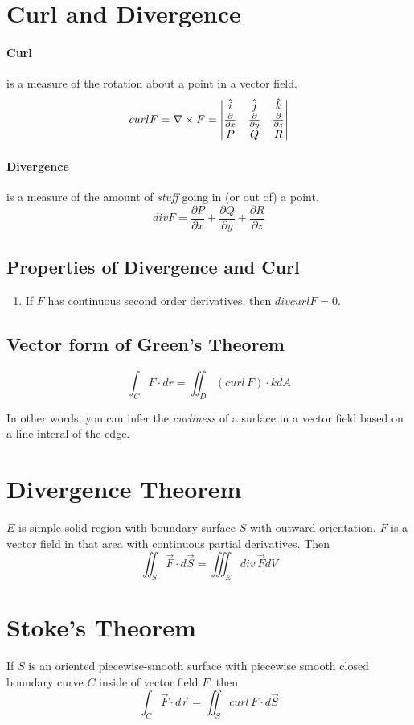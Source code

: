 \documentclass[a4paper,12pt]{report}
\begin{document}
\section{Curl and Divergence}
\paragraph{Curl } is a measure of the rotation about a point in a vector field.
$$curl F = \nabla \times F = 
\begin{vmatrix}
\hat{i} & \hat{j} & \hat{k} \\ 
\frac{\partial}{\partial x} & \frac{\partial}{\partial y} & \frac{\partial }{\partial z} \\
P & Q & R \notag
\end{vmatrix}
$$

\paragraph{Divergence } is a measure of the amount of \textit{stuff} going in (or out of) a point. 
$$div F = \frac{\partial P}{\partial x} + \frac{\partial Q}{\partial y} + \frac{\partial R}{\partial z}$$

\subsection{Properties of Divergence and Curl}
\begin{enumerate}
\item If $F$ has continuous second order derivatives, then $div curl F = 0$.
\end{enumerate}

\subsection{Vector form of Green's Theorem}
$$\int_C F \cdot dr = \iint_D (curl\,F)\cdot k dA$$

In other words, you can infer the \textit{curliness} of a surface in a vector field based on a line interal of the edge.

\section{Divergence Theorem}
$E$ is simple solid region with boundary surface $S$ with outward orientation. $F$ is a vector field in that area 
with continuous partial derivatives. Then
$$\iint_S \vec{F}\cdot d\vec{S} = \iiint_E div\,\vec{F} dV$$


\section{Stoke's Theorem}
If $S$ is an oriented piecewise-smooth surface with piecewise smooth closed boundary curve $C$ inside of 
vector field $F$, then 
$$\int_C \vec{F} \cdot d\vec{r} = \iint_S curl\,F\cdot d\vec{S}$$
\end{document}
